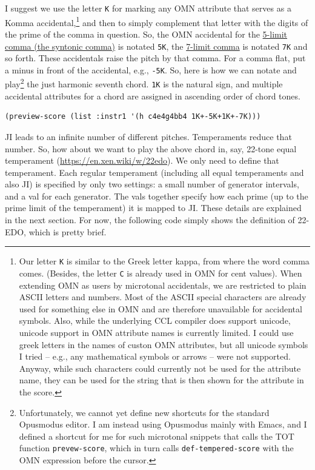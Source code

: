 \documentclass[11pt]{article}
\begin{document}
I suggest we use the letter \texttt{K} for marking any OMN attribute that serves as a Komma
accidental,\footnote{Our letter \texttt{K} is similar to the Greek letter kappa, from where the word comma
comes. (Besides, the letter \texttt{C} is already used in OMN for cent values). When extending OMN as
users by microtonal accidentals, we are restricted to plain ASCII letters and numbers. Most of the
ASCII special characters are already used for something else in OMN and are therefore unavailable
for accidental symbols. Also, while the underlying CCL compiler does support unicode, unicode
support in OMN attribute names is currently limited. I could use greek letters in the names of
custon OMN attributes, but all unicode symbols I tried -- e.g., any mathematical symbols or arrows
-- were not supported. Anyway, while such characters could currently not be used for the attribute
name, they can be used for the string that is then shown for the attribute in the score.} and then
to simply complement that letter with the digits of the prime of the comma in question. So, the
OMN accidental for the \href{https://en.wikipedia.org/wiki/Syntonic\_comma}{5-limit comma (the syntonic comma)} is notated \texttt{5K}, the \href{https://en.wikipedia.org/wiki/Septimal\_comma }{7-limit comma} is
notated \texttt{7K} and so forth. These accidentals raise the pitch by that comma. For a comma flat, put
a minus in front of the accidental, e.g., \texttt{-5K}. So, here is how we can notate and play\footnote{Unfortunately, we cannot yet define new shortcuts for the standard Opusmodus editor. I am instead
using Opusmodus mainly with Emacs, and I defined a shortcut for me for such microtonal snippets
that calls the TOT function \texttt{prevew-score}, which in turn calls \texttt{def-tempered-score} with the OMN
expression before the cursor.} the just harmonic seventh chord.  \texttt{1K} is the natural sign, and
multiple accidental attributes for a chord are assigned in ascending order of chord tones.


\begin{verbatim}
(preview-score (list :instr1 '(h c4e4g4bb4 1K+-5K+1K+-7K)))
\end{verbatim}


JI leads to an infinite number of different pitches. Temperaments reduce that number. So, how about
we want to play the above chord in, say, 22-tone equal temperament
(\url{https://en.xen.wiki/w/22edo}). We only need to define that temperament. Each regular
temperament (including all equal temperaments and also JI) is specified by only two settings: a small
number of generator intervals, and a val for each generator. The vals together specify how each
prime (up to the prime limit of the temperament) it is mapped to JI. These details are explained
in the next section. For now, the following code simply shows the definition of 22-EDO, which is pretty brief. 
\end{document}
